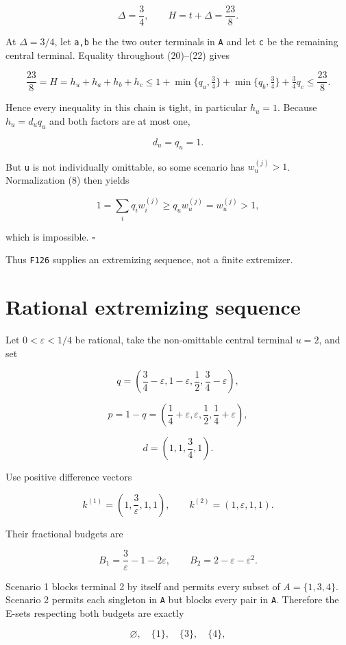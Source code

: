 \documentclass[
  11pt,
]{article}
\begin{document}
\[
\Delta=\frac34,
\qquad
H=t+\Delta=\frac{23}{8}.
\]

At \(\Delta=3/4\), let \texttt{a,b} be the two outer terminals in
\texttt{A} and let \texttt{c} be the remaining central terminal.
Equality throughout (20)--(22) gives

\[
\frac{23}{8}=H
=h_u+h_a+h_b+h_c
\le
1+\min\{q_a,\tfrac34\}
 +\min\{q_b,\tfrac34\}
 +\tfrac34 q_c
\le
\frac{23}{8}.
\]

Hence every inequality in this chain is tight, in particular \(h_u=1\).
Because \(h_u=d_uq_u\) and both factors are at most one,

\[
d_u=q_u=1.
\]

But \texttt{u} is not individually omittable, so some scenario has
\(w_u^{(j)}>1\). Normalization (8) then yields

\[
1=\sum_iq_iw_i^{(j)}
\ge q_uw_u^{(j)}
=w_u^{(j)}>1,
\]

which is impossible. \(\square\)

Thus \texttt{F126} supplies an extremizing sequence, not a finite
extremizer.

\section{Rational extremizing
sequence}\label{rational-extremizing-sequence}

Let \(0<\varepsilon<1/4\) be rational, take the non-omittable central
terminal \(u=2\), and set

\[
q=\left(
\frac34-\varepsilon,
1-\varepsilon,
\frac12,
\frac34-\varepsilon
\right),
\]

\[
p=1-q=\left(
\frac14+\varepsilon,
\varepsilon,
\frac12,
\frac14+\varepsilon
\right),
\]

\[
d=\left(1,1,\frac34,1\right).
\tag{25}
\]

Use positive difference vectors

\[
k^{(1)}=\left(1,\frac3\varepsilon,1,1\right),
\qquad
k^{(2)}=(1,\varepsilon,1,1).
\tag{26}
\]

Their fractional budgets are

\[
B_1=\frac3\varepsilon-1-2\varepsilon,
\qquad
B_2=2-\varepsilon-\varepsilon^2.
\]

Scenario 1 blocks terminal 2 by itself and permits every subset of
\(A=\{1,3,4\}\). Scenario 2 permits each singleton in \texttt{A} but
blocks every pair in \texttt{A}. Therefore the E-sets respecting both
budgets are exactly

\[
\varnothing,
\quad\{1\},
\quad\{3\},
\quad\{4\},
\]
\end{document}
